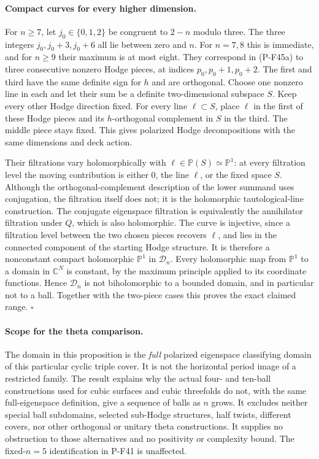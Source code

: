 \documentclass[11pt,a4paper]{article}
\begin{document}
\paragraph{Compact curves for every higher dimension.}
For $n\ge7$, let $j_0\in\{0,1,2\}$ be congruent to
$2-n$ modulo three. The three integers
$j_0,j_0+3,j_0+6$ all lie between zero and $n$.
For $n=7,8$ this is immediate, and for $n\ge9$ their
maximum is at most eight. They correspond in (P-F45a)
to three consecutive nonzero Hodge pieces, at indices
$p_0,p_0+1,p_0+2$. The first and third have the same
definite sign for $h$ and are orthogonal. Choose one
nonzero line in each and let their sum be a definite
two-dimensional subspace $S$. Keep every other Hodge
direction fixed. For every line $\ell\subset S$, place
$\ell$ in the first of these Hodge pieces and its
$h$-orthogonal complement in $S$ in the third. The
middle piece stays fixed. This gives polarized Hodge
decompositions with the same dimensions and deck action.

Their filtrations vary holomorphically with
$\ell\in\mathbb P(S)\simeq\mathbb P^1$: at every
filtration level the moving contribution is either
$0$, the line $\ell$, or the fixed space $S$. Although
the orthogonal-complement description of the lower
summand uses conjugation, the filtration itself does
not; it is the holomorphic tautological-line construction.
The conjugate eigenspace filtration is equivalently
the annihilator filtration under $Q$, which is also
holomorphic. The curve is injective, since a filtration
level between the two chosen pieces recovers $\ell$,
and lies in the connected component of the starting
Hodge structure. It is therefore a nonconstant compact
holomorphic $\mathbb P^1$ in $\mathcal D_n$.
Every holomorphic map from $\mathbb P^1$ to a domain
in $\mathbb C^N$ is constant, by the maximum principle
applied to its coordinate functions. Hence
$\mathcal D_n$ is not biholomorphic to a bounded domain,
and in particular not to a ball. Together with the
two-piece cases this proves the exact claimed range.
\hfill$\square$

\paragraph{Scope for the theta comparison.}
The domain in this proposition is the \emph{full}
polarized eigenspace classifying domain of this particular
cyclic triple cover. It is not the horizontal period image
of a restricted family. The result explains why the actual
four- and ten-ball constructions used for cubic surfaces
and cubic threefolds do not, with the same full-eigenspace
definition, give a sequence of balls as $n$ grows.
It excludes neither special ball subdomains, selected
sub-Hodge structures, half twists, different covers, nor
other orthogonal or unitary theta constructions. It supplies
no obstruction to those alternatives and no positivity or
complexity bound. The fixed-$n=5$ identification in P-F41
is unaffected.
\end{document}
